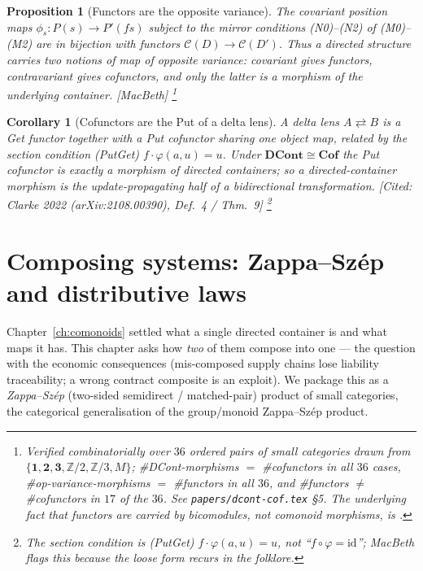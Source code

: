 \documentclass[11pt,a4paper]{book}
\newcommand{\Cof}{\mathbf{Cof}}
\newcommand{\DCont}{\mathbf{DCont}}
\newcommand{\id}{\mathrm{id}}
\theoremstyle{plain}
\newtheorem{Proposition}[Theorem]{Proposition}
\newtheorem{Corollary}[Theorem]{Corollary}
\theoremstyle{definition}
\theoremstyle{remark}
\newcommand{\prov}[1]{\hfill\textsf{\footnotesize[#1]}}
\begin{document}
\begin{Proposition}[Functors are the opposite variance]\label{prop:cov}
The \emph{covariant} position maps $\phi_s\colon P(s)\to P'(fs)$ subject to the
mirror conditions (N0)--(N2) of (M0)--(M2) are in bijection with \emph{functors}
$\mathcal C(D)\to\mathcal C(D')$. Thus a directed structure carries two notions of
map of opposite variance: covariant gives functors, contravariant gives
cofunctors, and only the latter is a morphism of the underlying container.
\prov{MacBeth}%
\footnote{Verified combinatorially over $36$ ordered pairs of small categories
drawn from $\{\mathbf1,\mathbf2,\mathbf3,\mathbb Z/2,\mathbb Z/3,M\}$;
\#DCont-morphisms $=$ \#cofunctors in all $36$ cases, \#op-variance-morphisms $=$
\#functors in all $36$, and \#functors $\neq$ \#cofunctors in $17$ of the $36$.
See \texttt{papers/dcont-cof.tex} \S5. The underlying fact that functors are
carried by bicomodules, not comonoid morphisms, is \cite{SS23}.}
\end{Proposition}

\begin{Corollary}[Cofunctors are the Put of a delta lens]\label{cor:lens}
A \emph{delta lens} $A\rightleftarrows B$ is a \emph{Get} functor together with a
\emph{Put} cofunctor sharing one object map, related by the section condition
(PutGet) $f\cdot\varphi(a,u)=u$. Under $\DCont\cong\Cof$ the Put cofunctor is
exactly a morphism of directed containers; so a directed-container morphism is the
update-propagating half of a bidirectional transformation.
\prov{Cited: Clarke 2022 (arXiv:2108.00390), Def.\ 4 / Thm.\ 9}%
\footnote{The section condition is (PutGet) $f\cdot\varphi(a,u)=u$, \emph{not}
``$f\circ\varphi=\id$''; MacBeth flags this because the loose form recurs in the
folklore.}
\end{Corollary}

\chapter{Composing systems: Zappa--Sz\'ep and distributive laws}
\label{ch:zs}

Chapter~\ref{ch:comonoids} settled what a single directed container is and what
maps it has. This chapter asks how \emph{two} of them compose into one --- the
question with the economic consequences (mis-composed supply chains lose liability
traceability; a wrong contract composite is an exploit). We package this as a
\emph{Zappa--Sz\'ep} (two-sided semidirect / matched-pair) product of small
categories, the categorical generalisation of the group/monoid Zappa--Sz\'ep
product.
\end{document}
